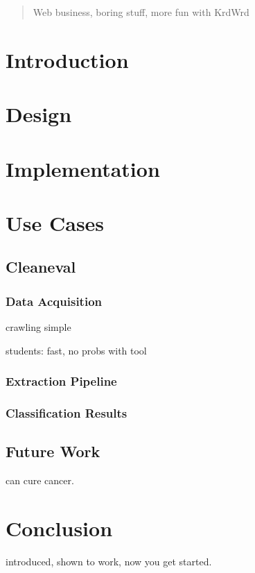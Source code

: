 \begin{abstract}
Web business, boring stuff, more fun with KrdWrd
\end{abstract}

\section{Introduction}


\section{Design}


\section{Implementation}


\section{Use Cases}

\subsection{Cleaneval}
\subsubsection{Data Acquisition}
crawling simple

students: fast, no probs with tool

\subsubsection{Extraction Pipeline}

\subsubsection{Classification Results}

\cite{libsvm}

\subsection{Future Work}
can cure cancer.

\section{Conclusion}
introduced, shown to work, now you get started.


